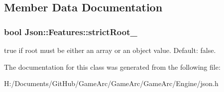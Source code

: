 \subsection{Member Data Documentation}
\hypertarget{class_json_1_1_features_a1162c37a1458adc32582b585b552f9c3}{
\subsubsection[{strict\+Root\+\_\+}]{\setlength{\rightskip}{0pt plus 5cm}bool Json\+::\+Features\+::strict\+Root\+\_\+}}\label{class_json_1_1_features_a1162c37a1458adc32582b585b552f9c3}
{\ttfamily true} if root must be either an array or an object value. Default\+: {\ttfamily false}. 

The documentation for this class was generated from the following file\+:\begin{DoxyCompactItemize}
\item 
H\+:/\+Documents/\+Git\+Hub/\+Game\+Arc/\+Game\+Arc/\+Game\+Arc/\+Engine/json.\+h\end{DoxyCompactItemize}
